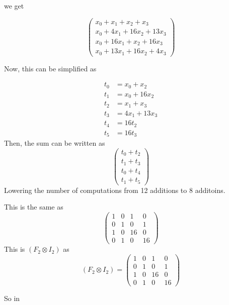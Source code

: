 \documentclass{article}
\begin{document}
	we get
	
	\begin{equation}
		\begin{pmatrix}
			x_0+x_1+x_2+x_3 \\
			x_0+4x_1+16x_2+13x_3 \\
			x_0 + 16x_1+x_2+16x_3 \\
			x_0+13x_1+16x_2+4x_3
		\end{pmatrix}
	\end{equation}

	Now, this can be simplified as
	
	\begin{align}
		t_0 &= x_0+x_2 \\
		t_1 &= x_0+16x_2 \\
		t_2 &= x_1+x_3 \\
		t_3 &= 4x_1+13x_3 \\
		t_4 &= 16t_2 \\
		t_5 &= 16t_3 
	\end{align}
	Then, the sum can be written as
	\begin{equation}
		\begin{pmatrix}
			t_0+t_2 \\
			t_1+t_3 \\
			t_0+t_4 \\
			t_1+t_5
		\end{pmatrix}
	\end{equation}
	Lowering the number of computations from 12 additions to 8 additoins.

	This is the same as
	\begin{equation}
		\begin{pmatrix}
			1 & 0 & 1 & 0 \\
			0 & 1 & 0 & 1 \\
			1 & 0 & 16 & 0 \\
			0 & 1 & 0 & 16
		\end{pmatrix}
	\end{equation}
	This is $(F_2 \otimes I_2)$ as
	\begin{equation}
		(F_2 \otimes I_2) = \begin{pmatrix}
			1 & 0 & 1 & 0\\
			0 & 1 & 0 & 1\\
			1 & 0 & 16 & 0 \\
			0 & 1 & 0 & 16
		\end{pmatrix}
	\end{equation}

	So in
		
\end{document}
